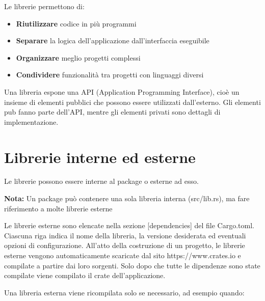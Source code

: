 Le librerie permettono di:

\begin{itemize}
  \item \textbf{Riutilizzare} codice in più programmi
  \item \textbf{Separare} la logica dell'applicazione dall'interfaccia eseguibile
  \item \textbf{Organizzare} meglio progetti complessi
  \item \textbf{Condividere} funzionalità tra progetti con linguaggi diversi
\end{itemize}



Una libreria espone una API (Application Programming Interface), cioè un insieme
di elementi pubblici che possono essere utilizzati dall'esterno.
Gli elementi pub fanno parte dell'API, mentre gli elementi privati sono dettagli
di implementazione.

\section{Librerie interne ed esterne}

Le librerie possono essere interne al package o esterne ad esso.

\begin{tcolorbox}
  \textbf{Nota: }Un package può contenere una sola libreria interna (src/lib.rs),
  ma fare riferimento a molte librerie esterne
\end{tcolorbox}


Le librerie esterne sono elencate nella sezione [dependencies] del file Cargo.toml.
Ciascuna riga indica il nome della libreria, la versione desiderata ed eventuali
opzioni di configurazione.
All'atto della costruzione di un progetto, le librerie esterne vengono
automaticamente scaricate dal sito https://www.crates.io e compilate a partire
dai loro sorgenti.
Solo dopo che tutte le dipendenze sono state compilate viene compilato il crate
dell'applicazione.


Una libreria esterna viene ricompilata solo se necessario, ad esempio quando:

